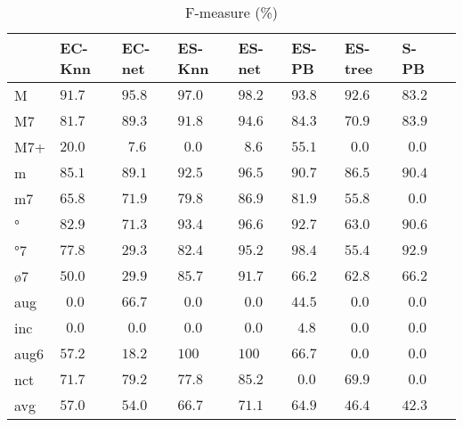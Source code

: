 \documentclass{article}
\begin{document}
\begin{table}
  \centering
\begin{tabular}{l|p{0.5cm}p{0.5cm}p{0.5cm}p{0.5cm}p{0.5cm}p{0.5cm}p{0.5cm}p{0.5cm}}
     &   EC-Knn &   EC-net &   ES-Knn &   ES-net &    ES-PB &  ES-tree &        S-PB \\ \hline
   M & $  91.7$ & $  95.8$ & $  97.0$ & $  98.2$ & $  93.8$ & $  92.6$ & $  83.2$ \\
  M7 & $  81.7$ & $  89.3$ & $  91.8$ & $  94.6$ & $  84.3$ & $  70.9$ & $  83.9$ \\
 M7+ & $  20.0$ & $ ~~7.6$ & $ ~~0.0$ & $ ~~8.6$ & $  55.1$ & $ ~~0.0$ & $ ~~0.0$ \\
   m & $  85.1$ & $  89.1$ & $  92.5$ & $  96.5$ & $  90.7$ & $  86.5$ & $  90.4$ \\
  m7 & $  65.8$ & $  71.9$ & $  79.8$ & $  86.9$ & $  81.9$ & $  55.8$ & $ ~~0.0$ \\
   ° & $  82.9$ & $  71.3$ & $  93.4$ & $  96.6$ & $  92.7$ & $  63.0$ & $  90.6$ \\
  °7 & $  77.8$ & $  29.3$ & $  82.4$ & $  95.2$ & $  98.4$ & $  55.4$ & $  92.9$ \\
  ø7 & $  50.0$ & $  29.9$ & $  85.7$ & $  91.7$ & $  66.2$ & $  62.8$ & $  66.2$ \\
 aug & $ ~~0.0$ & $  66.7$ & $ ~~0.0$ & $ ~~0.0$ & $  44.5$ & $ ~~0.0$ & $ ~~0.0$ \\
 inc & $ ~~0.0$ & $ ~~0.0$ & $ ~~0.0$ & $ ~~0.0$ & $ ~~4.8$ & $ ~~0.0$ & $ ~~0.0$ \\
aug6 & $  57.2$ & $  18.2$ & $ 100  $ & $ 100  $ & $  66.7$ & $ ~~0.0$ & $ ~~0.0$ \\
 nct & $  71.7$ & $  79.2$ & $  77.8$ & $  85.2$ & $ ~~0.0$ & $  69.9$ & $ ~~0.0$ \\
\hline                                                       
 avg & $  57.0$ & $  54.0$ & $  66.7$ & $  71.1$ & $  64.9$ & $  46.4$ & $  42.3$ \\
\end{tabular}


  \caption{F-measure (\%)}
  \label{tab:f-measure}
\end{table}
\end{document}
